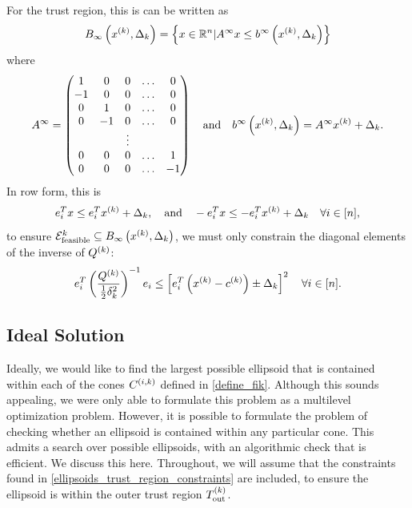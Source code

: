 For the trust region, this is can be written as
\begin{align*}
{ B_{\infty}\left(x^{(k)}, \Delta_k\right) } = \left\{ x \in \mathbb R^n | A^{\infty} x\le b^{\infty}\left(x^{(k)}, \Delta_k\right) \right\}
\end{align*}
where
\begin{align}
A^{\infty} = \begin{pmatrix}
 1 &  0 & 0      & \ldots &  0 \\
-1 &  0 & 0      & \ldots &  0 \\
 0 &  1 & 0      & \ldots &  0 \\
 0 & -1 & 0      & \ldots &  0 \\
   &    & \vdots &        &    \\
 0 &  0 &      0 & \ldots &  1 \\
 0 &  0 &      0 & \ldots & -1 \\
\end{pmatrix} \quad \textrm{and} \quad
b^{\infty}\left(x^{(k)}, \Delta_k\right) = A^{\infty} x^{(k)} + \Delta_k. \label{define_atr}
\end{align}
In row form, this is
\begin{align*}
e_i ^T x \le e_i^Tx^{(k)} + \Delta_k, \quad \textrm{and} \quad
-e_i ^T x \le -e_i^Tx^{(k)} + \Delta_k \quad \forall i \in [n],
\end{align*}
to ensure ${\mathcal E^k_{\textrm{feasible}}} \subseteq { B_{\infty}\left(x^{(k)}, \Delta_k\right) }$, we must only constrain the diagonal elements of the inverse of ${Q^{(k)}}$:
\begin{align}
e_i^T\left(\frac{{Q^{(k)}}}{\frac 1 2 \delta_k^2}\right)^{-1} e_i \le \left[e_i^T\left(x^{(k)} - {c^{(k)}}\right) \pm \Delta_k \right]^2 \quad \forall i \in [n].
\label{ellipsoids_trust_region_constraints}
\end{align}



\subsection{Ideal Solution}
\label{ideal_ellipsoid_in_polyhedron}
Ideally, we would like to find the largest possible ellipsoid that is contained within each of the cones ${C^{(i, k)}}$ defined in \cref{define_fik}.
Although this sounds appealing, we were only able to formulate this problem as a multilevel optimization problem.
However, it is possible to formulate the problem of checking whether an ellipsoid is contained within any particular cone.
This admits a search over possible ellipsoids, with an algorithmic check that is efficient.  
We discuss this here.
Throughout, we will assume that the constraints found in \cref{ellipsoids_trust_region_constraints} are included, 
to ensure the ellipsoid is within the outer trust region ${T_{\text{out}}^{(k)}}$.

